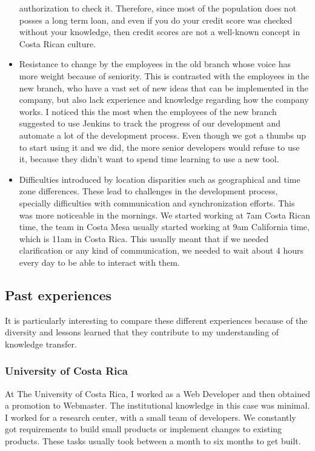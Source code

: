 \documentclass[12pt, letterpaper]{article}
\begin{document}
\begin{itemize}
  authorization to check it. Therefore, since most of the population does not posses a long term loan, and even if you do
  your credit score was checked without your knowledge, then credit scores are not a well-known concept in Costa Rican culture.
  \item Resistance to change by the employees in the old branch whose voice has more weight
  because of seniority. This is contrasted with the employees in the new branch, who have a vast set of new ideas 
  that can be implemented in the company, but also lack experience and knowledge regarding how the company works.
  I noticed this the most when the employees of the new branch suggested to use Jenkins to track the progress of our
  development and automate a lot of the development process. Even though we got a thumbs up to start using it and we did,
  the more senior developers would refuse to use it, because they didn't want to spend time learning to use a new tool.
  \item Difficulties introduced by location disparities such as geographical and time zone differences. These lead to 
  challenges in the development process, specially difficulties with communication and synchronization efforts.
  This was more noticeable in the mornings. We started working at 7am Costa Rican time, the team in Costa Mesa usually
  started working at 9am California time, which is 11am in Costa Rica. This usually meant that if we needed clarification
  or any kind of communication, we needed to wait about 4 hours every day to be able to interact with them.
  
\end{itemize}

\subsection{Past experiences}
It is particularly interesting to compare these different experiences because of the diversity and lessons learned
that they contribute to my understanding of knowledge transfer.

\subsubsection{University of Costa Rica}
At The University of Costa Rica, I worked as a Web Developer and then obtained a promotion to Webmaster. 
The institutional knowledge in this case was minimal.
I worked for a research center, with a small team of developers. We constantly got requirements to build small products 
or implement changes to existing products. These tasks usually took between a month to six months to get built.
\end{document}
